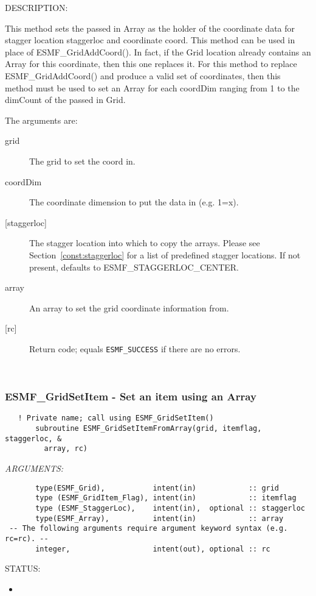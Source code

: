 {\sf DESCRIPTION:\\ }


   This method sets the passed in Array as the holder of the coordinate
   data for stagger location staggerloc and coordinate coord. This method
   can be used in place of ESMF\_GridAddCoord(). In fact, if the Grid
   location already contains an Array for this coordinate, then this one
   replaces it. For this method to replace ESMF\_GridAddCoord() and produce
   a valid set of coordinates, then this method must be used to set
   an Array for each coordDim ranging from 1 to the dimCount of the passed in Grid.
  
       The arguments are:
  \begin{description}
  \item[grid]
      The grid to set the coord in.
  \item[coordDim]
      The coordinate dimension to put the data in (e.g. 1=x).
  \item[{[staggerloc]}]
      The stagger location into which to copy the arrays.
      Please see Section~\ref{const:staggerloc} for a list
      of predefined stagger locations. If not present, defaults to
      ESMF\_STAGGERLOC\_CENTER.
  \item[array]
      An array to set the grid coordinate information from.
  \item[{[rc]}]
      Return code; equals {\tt ESMF\_SUCCESS} if there are no errors.
  \end{description}
   
 
\mbox{}\hrulefill\ 
 
\subsubsection [ESMF\_GridSetItem] {ESMF\_GridSetItem - Set an item using an Array}


 
\begin{verbatim}   ! Private name; call using ESMF_GridSetItem()
       subroutine ESMF_GridSetItemFromArray(grid, itemflag,  staggerloc, &
         array, rc)\end{verbatim}{\em ARGUMENTS:}
\begin{verbatim}       type(ESMF_Grid),           intent(in)            :: grid
       type (ESMF_GridItem_Flag), intent(in)            :: itemflag
       type (ESMF_StaggerLoc),    intent(in),  optional :: staggerloc
       type(ESMF_Array),          intent(in)            :: array
 -- The following arguments require argument keyword syntax (e.g. rc=rc). --
       integer,                   intent(out), optional :: rc\end{verbatim}
{\sf STATUS:}
   \begin{itemize}
   \item{}
   \end{itemize}
  
